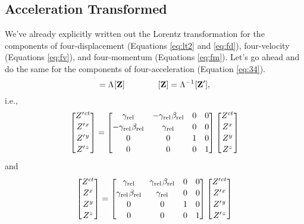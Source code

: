 \documentclass[12pt]{article}
\renewcommand{\vv}[1]{\mathbf{#1}}
\begin{document}
\subsection{Acceleration Transformed}\label{ssec:at}

We've already explicitly written out the Lorentz transformation for the components of four-displacement (Equations \ref{eq:lt2} and \ref{eq:fd}), four-velocity (Equations \ref{eq:fv}), and four-momentum (Equations \ref{eq:fm}). Let's go ahead and do the same for the components of four-acceleration (Equation \ref{eq:34}).
\begin{equation*}
[\vv Z^\prime] = \Lambda \mkern1mu [\vv Z] \qquad \qquad [\vv Z] = \Lambda^{-1} \mkern1mu [\vv Z^\prime] ,
\end{equation*}
i.e.,
\begin{equation*}
\begin{bmatrix}
Z^{\prime \mkern1.5mu ct} \\[.15 em]
Z^{\prime \mkern1.5mu x} \\[.15 em]
Z^{\prime \mkern1.5mu y} \\[.15 em]
Z^{\prime \mkern1.5mu z}
\end{bmatrix}
=
\begin{bmatrix}
\gamma_{\textrm{rel}} & -\gamma_{\textrm{rel}} \mkern1mu \beta_{\textrm{rel}} & 0 & 0 \\[.15 em]
- \gamma_{\textrm{rel}} \mkern1mu \beta_{\textrm{rel}} & \gamma_{\textrm{rel}} & 0 & 0 \\[.15 em]
0 & 0 & 1 & 0 \\[.15 em]
0 & 0 & 0 & 1
\end{bmatrix}
\begin{bmatrix}
Z^{ct} \\[.15 em]
Z^{x} \\[.15 em]
Z^{y} \\[.15 em]
Z^{z}
\end{bmatrix}
\end{equation*}
and
\begin{equation*}
\begin{bmatrix}
Z^{ct} \\[.15 em]
Z^{x} \\[.15 em]
Z^{y} \\[.15 em]
Z^{z}
\end{bmatrix}
=
\begin{bmatrix}
\gamma_{\textrm{rel}} & \gamma_{\textrm{rel}} \mkern1mu \beta_{\textrm{rel}} & 0 & 0 \\[.15 em]
\gamma_{\textrm{rel}} \mkern1mu \beta_{\textrm{rel}} & \gamma_{\textrm{rel}} & 0 & 0 \\[.15 em]
0 & 0 & 1 & 0 \\[.15 em]
0 & 0 & 0 & 1
\end{bmatrix}
\begin{bmatrix}
Z^{\prime \mkern1.5mu ct} \\[.15 em]
Z^{\prime \mkern1.5mu x} \\[.15 em]
Z^{\prime \mkern1.5mu y} \\[.15 em]
Z^{\prime \mkern1.5mu z}
\end{bmatrix}
\end{equation*}
\end{document}
